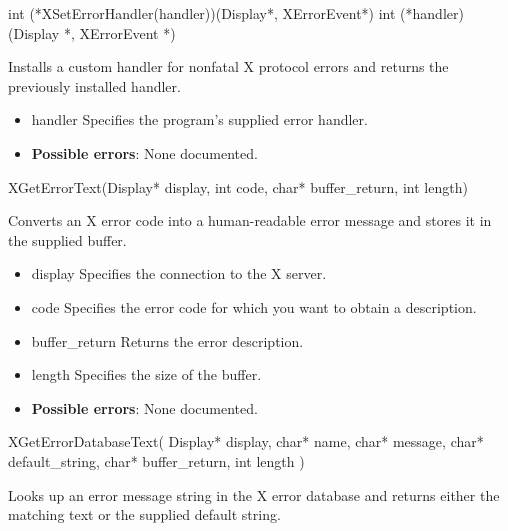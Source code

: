 \documentclass{report}
\begin{document}
\begin{itemize}
        \begin{cppcode}
            int (*XSetErrorHandler(handler))(Display*, XErrorEvent*)
                int (*handler)(Display *, XErrorEvent *)
        \end{cppcode}
        \bigbreak \noindent
        Installs a custom handler for nonfatal X protocol errors and returns the previously installed handler.

        \begin{itemize}
            \item handler Specifies the program’s supplied error handler.
        \end{itemize}

        \begin{itemize}
            \item \textbf{Possible errors}: None documented.
        \end{itemize}

        \begin{cppcode}
            XGetErrorText(Display* display, int code, char* buffer_return, int length)
        \end{cppcode}
        \bigbreak \noindent
        Converts an X error code into a human-readable error message and stores it in the supplied buffer.

        \begin{itemize}
            \item display Specifies the connection to the X server.
            \item code Specifies the error code for which you want to obtain a description.
            \item buffer\_return Returns the error description.
            \item length Specifies the size of the buffer.
        \end{itemize}

        \begin{itemize}
            \item \textbf{Possible errors}: None documented.
        \end{itemize}

        \begin{cppcode}
            XGetErrorDatabaseText(
                Display* display,
                char* name,
                char* message,
                char* default_string,
                char* buffer_return,
                int length
            )
        \end{cppcode}
        \bigbreak \noindent
        Looks up an error message string in the X error database and returns either the matching text or the supplied default string.


\end{itemize}
\end{document}
